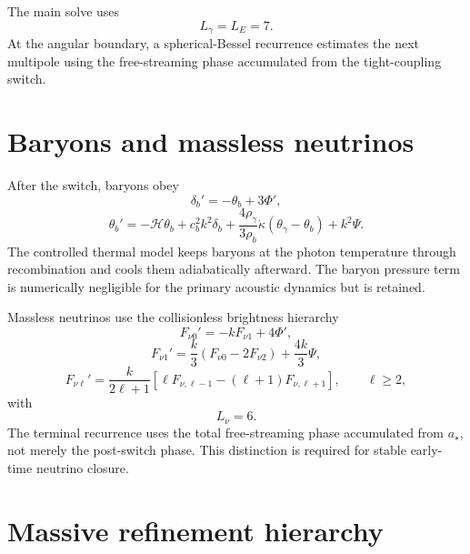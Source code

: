 The main solve uses
\begin{equation}
 L_\gamma=L_E=7.
 \label{eq:pcmb-photon-lmax}
\end{equation}
At the angular boundary, a spherical-Bessel recurrence estimates the next multipole using the free-streaming phase accumulated from the tight-coupling switch.

\section{Baryons and massless neutrinos}

After the switch, baryons obey
\begin{equation}
 \delta_b'=-\theta_b+3\Phi',
 \label{eq:pcmb-baryon-continuity}
\end{equation}
\begin{equation}
 \theta_b'
 =-\mathcal H\theta_b
 +c_b^2k^2\delta_b
 +\frac{4\rho_\gamma}{3\rho_b}\dot\kappa(\theta_\gamma-\theta_b)
 +k^2\Psi.
 \label{eq:pcmb-baryon-euler}
\end{equation}
The controlled thermal model keeps baryons at the photon temperature through recombination and cools them adiabatically afterward.  The baryon pressure term is numerically negligible for the primary acoustic dynamics but is retained.

Massless neutrinos use the collisionless brightness hierarchy
\begin{equation}
 F_{\nu0}'=-kF_{\nu1}+4\Phi',
 \label{eq:pcmb-nu-zero}
\end{equation}
\begin{equation}
 F_{\nu1}'=\frac{k}{3}(F_{\nu0}-2F_{\nu2})+\frac{4k}{3}\Psi,
 \label{eq:pcmb-nu-one}
\end{equation}
\begin{equation}
 F_{\nu\ell}'
 =\frac{k}{2\ell+1}
 \left[\ell F_{\nu,\ell-1}-(\ell+1)F_{\nu,\ell+1}\right],
 \qquad \ell\geq2,
 \label{eq:pcmb-nu-general}
\end{equation}
with
\begin{equation}
 L_\nu=6.
 \label{eq:pcmb-nu-lmax}
\end{equation}
The terminal recurrence uses the total free-streaming phase accumulated from $a_\star$, not merely the post-switch phase.  This distinction is required for stable early-time neutrino closure.

\section{Massive refinement hierarchy}

